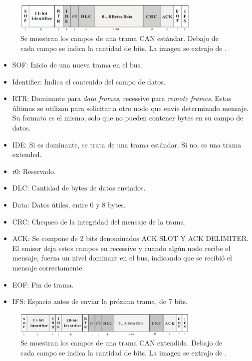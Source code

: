 \begin{figure}[H]
    \centering
    \includegraphics[width=0.8\textwidth]{img/CAN_frame_standard.png}
    \caption{Se muestran los campos de una trama CAN estándar. Debajo de cada campo se indica la cantidad de bits. La imagen se extrajo de \cite{texasSLOA101B}.}
    \label{fig:CAN_frame_standard}
\end{figure}

\begin{itemize}
    \item SOF: Inicio de una nueva trama en el bus.
    \item Identifier: Indica el contenido del campo de datos.
    \item RTR: Dominante para \textit{data frames}, recessive para \textit{remote frames}. Estas últimas se utilizan para solicitar a otro nodo que envíe determinado mensaje. Su formato es el mismo, solo que no pueden contener bytes en su campo de datos.
    \item IDE: Si es dominante, se trata de una trama estándar. Si no, es una trama extended.
    \item r0: Reservado.
    \item DLC: Cantidad de bytes de datos enviados.
    \item Data: Datos útiles, entre 0 y 8 bytes.
    \item CRC: Chequeo de la integridad del mensaje de la trama.
    \item ACK: Se compone de 2 bits denominados ACK SLOT Y ACK DELIMITER. El emisor deja estos campos en recessive y cuando algún nodo recibe el mensaje, fuerza un nivel dominant en el bus, indicando que se recibió el mensaje correctamente.
    \item EOF: Fin de trama.
    \item IFS: Espacio antes de enviar la próxima trama, de 7 bits. 
\end{itemize}

\begin{figure}[H]
    \centering
    \includegraphics[width=0.8\textwidth]{img/CAN_frame_extended.png}
    \caption{Se muestran los campos de una trama CAN extendida. Debajo de cada campo se indica la cantidad de bits. La imagen se extrajo de \cite{texasSLOA101B}.}
    \label{fig:CAN_frame_extended}
\end{figure}

